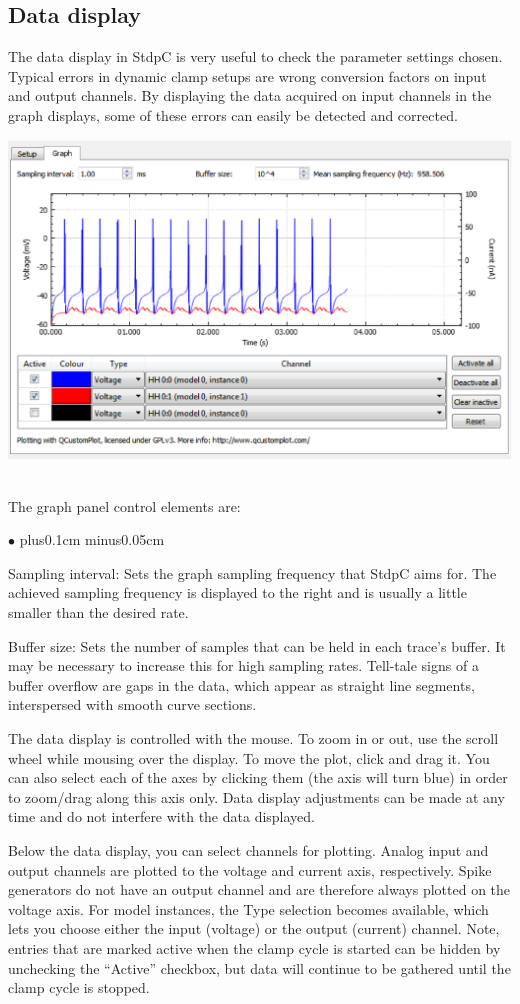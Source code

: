 \documentclass{article}
\newenvironment{myitem}{\begin{list}{$\bullet$}{\setlength{\leftmargin}{1.1em}
\itemsep0.1cm plus0.1cm minus0.05cm
\listparindent0cm
\addtolength{\labelsep}{0.5\labelsep}
\setlength{\labelwidth}{0.8em}
\setlength{\leftmargin}{\labelwidth}
\addtolength{\leftmargin}{\labelsep}
}}{\end{list}}
\begin{document}
\subsection{Data display}
The data display in StdpC is very useful to check the parameter
settings chosen. Typical errors in dynamic clamp setups are wrong
conversion factors on input and output channels. By displaying the
data acquired on input channels in the graph displays, some of these
errors can easily be detected and corrected. \\[0.2cm]
\parbox{\textwidth}{
  \includegraphics[scale=0.6]{graphBlock}
} \\[0.2cm]
The graph panel control elements are:
\begin{myitem}
\item Sampling interval: Sets the graph sampling frequency that StdpC aims for.
The achieved sampling frequency is displayed to the right and is usually a little
smaller than the desired rate.
\item Buffer size: Sets the number of samples that can be held in each trace's buffer.
It may be necessary to increase this for high sampling rates. Tell-tale signs of a
buffer overflow are gaps in the data, which appear as straight line segments,
interspersed with smooth curve sections.
\item The data display is controlled with the mouse. To zoom in or out, use the scroll
wheel while mousing over the display. To move the plot, click and drag it. You can also select
each of the axes by clicking them (the axis will turn blue) in order to zoom/drag along
this axis only. Data display adjustments can be made at any time and do not interfere with
the data displayed.
\item Below the data display, you can select channels for plotting. Analog input and output
channels are plotted to the voltage and current axis, respectively. Spike generators
do not have an output channel and are therefore always plotted on the voltage axis.
For model instances, the Type selection becomes available, which lets you choose either
the input (voltage) or the output (current) channel. Note, entries that are marked
active when the clamp cycle is started can be hidden by unchecking the ``Active'' checkbox,
but data will continue to be gathered until the clamp cycle is stopped.
\end{myitem}
\end{document}
